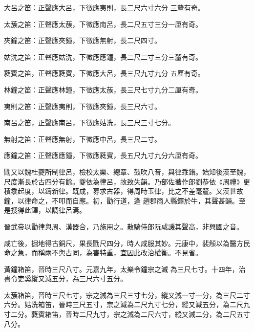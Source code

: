 \begin{pinyinscope}
大呂之笛：正聲應大呂，下徵應夷則，長二尺六寸六分
 三釐有奇。


太蔟之笛：正聲應太蔟，下徵應南呂，長二尺五寸三分一厘有奇。


夾鐘之笛：正聲應夾鐘，下徵應無射，長二尺四寸。


姑洗之笛：正聲應姑洗，下徵應應鐘，長二尺二寸三分三釐有奇。


蕤賓之笛，正聲應蕤賓，下徵應大呂，長三尺九寸九分
 五厘有奇。


林鐘之笛：正聲應林鐘，下徵應太蔟，長三尺七寸九分二厘有奇。


夷則之笛：正聲應夷則，下徵應夾鐘，長三尺六寸。


南呂之笛，正聲應南呂，下徵應姑洗，長三尺三寸七分。


無射之笛：正聲應無射，下徵應中呂，長三尺二寸。


應鐘之笛：正聲應應鐘，下徵應蕤賓，長五尺九寸九分六厘有奇。



 勖又以魏杜夔所制律呂，檢校太樂、總章、鼓吹八音，與律乖錯。始知後漢至魏，尺度漸長於古四分有餘。夔依為律呂，故致失韻。乃部佐著作郎劉恭依《周禮》更積黍起度，以鑄新律。既成，募求古器，得周時玉律，比之不差毫釐。又漢世故鐘，以律命之，不叩而自應。初，勖行道，逢
 趙郡商人縣鐸於牛，其聲甚韻。至是搜得此鐸，以調律呂焉。



 晉武帝以勖律與周、漢器合，乃施用之。散騎侍郎阮咸譏其聲高，非興國之音。



 咸亡後，掘地得古銅尺，果長勖尺四分，時人咸服其妙。元康中，裴頠以為醫方民命之急，而稱兩不與古同，為害特重，宜因此改治權衡。不見省。


黃鐘箱笛，晉時三尺八寸。元嘉九年，太樂令鐘宗之減
 為三尺七寸。十四年，治書令吏奚縱又減五分，為三尺六寸五分。



 太蔟箱笛，晉時三尺七寸，宗之減為三尺三寸七分，縱又減一寸一分，為三尺二寸六分。姑洗箱笛，晉時三尺五寸，宗之減為二尺九寸七分，縱又減五分，為二尺九寸二分。蕤賓箱笛，晉時二尺九寸，宗之減為二尺六寸，縱又減二分，為二尺五寸八分。



\end{pinyinscope}